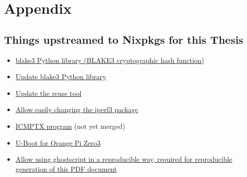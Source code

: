 
\chapter{Appendix}
\label{chap:appendix}

\section{Things upstreamed to Nixpkgs for this Thesis}
\begin{itemize}
  \item \href{https://github.com/NixOS/nixpkgs/pull/343277}{blake3 Python library (BLAKE3 cryptographic hash function)}
  \item \href{https://github.com/NixOS/nixpkgs/pull/360435}{Update blake3 Python library}
  \item \href{https://github.com/NixOS/nixpkgs/pull/281636}{Update the reuse tool}
  \item \href{https://github.com/NixOS/nixpkgs/pull/333462}{Allow easily changing the iperf3 package}
  \item \href{https://github.com/NixOS/nixpkgs/pull/357574}{ICMPTX program} (not yet merged)
  \item \href{https://github.com/NixOS/nixpkgs/pull/326845}{U-Boot for Orange Pi Zero3}
  \item \href{https://github.com/NixOS/nixpkgs/pull/362173}{Allow using ghostscript in a reproducible way, required for reproducible generation of this PDF document}
\end{itemize}

